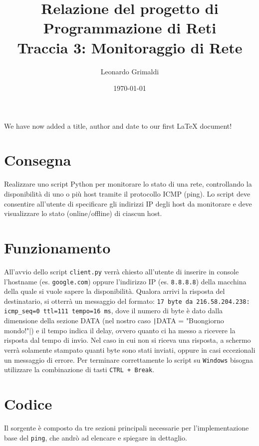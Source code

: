\documentclass[a4paper,12pt]{report}
\title{Relazione del progetto di Programmazione di Reti 
    \\ Traccia 3: Monitoraggio di Rete}
\author{Leonardo Grimaldi}
\date{\today}
\begin{document}
\maketitle
We have now added a title, author and date to our first \LaTeX{} document!
\section{Consegna}
Realizzare uno script Python per monitorare lo stato di una rete, controllando la disponibilità di uno o più host tramite il protocollo ICMP (ping).
%
Lo script deve consentire all'utente di specificare gli indirizzi IP degli host da monitorare e deve visualizzare lo stato (online/offline) di ciascun host.
\section{Funzionamento}
All'avvio dello script \texttt{client.py} verrà chiesto all'utente di inserire in console l'hostname (es. \texttt{google.com}) oppure l'indirizzo IP (es. \texttt{8.8.8.8}) della macchina della quale si vuole sapere la disponibilità.
%
Qualora arrivi la risposta del destinatario, si otterrà un messaggio del formato: \texttt{17 byte da 216.58.204.238: icmp\_seq=0 ttl=111 tempo=16 ms}, dove il numero di byte è dato dalla dimensione della sezione DATA (nel nostro caso \texttt|DATA = "Buongiorno mondo!"|) e il tempo indica il delay, ovvero quanto ci ha messo a ricevere la risposta dal tempo di invio.
%
Nel caso in cui non si riceva una risposta, a schermo verrà solamente stampato quanti byte sono stati inviati, oppure in casi eccezionali un messaggio di errore.
%
Per terminare correttamente lo script su \texttt{Windows} bisogna utilizzare la combinazione di tasti \texttt{CTRL + Break}.
\section{Codice}
Il sorgente è composto da tre sezioni principali necessarie per l'implementazione base del \texttt{ping}, che andrò ad elencare e spiegare in dettaglio.
\end{document}
